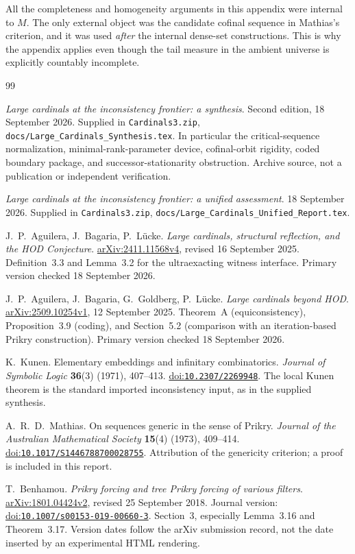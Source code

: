 \documentclass[11pt,letterpaper]{article}
\theoremstyle{definition}
\numberwithin{equation}{section}
\newcommand{\arxiv}[1]{\href{https://arxiv.org/abs/#1}{arXiv:#1}}
\newcommand{\doi}[1]{\href{https://doi.org/#1}{doi:\nolinkurl{#1}}}
\begin{document}
All the completeness and homogeneity arguments in this appendix were
internal to $M$. The only external object was the candidate cofinal
sequence in Mathias's criterion, and it was used \emph{after} the
internal dense-set constructions. This is why the appendix applies
even though the tail measure in the ambient universe is explicitly
countably incomplete.

\clearpage
{}
{}
\begin{thebibliography}{99}
\small
\setlength{\itemsep}{6pt}

\emph{Large cardinals at the inconsistency frontier: a synthesis}.
Second edition, 18 September 2026. Supplied in \nolinkurl{Cardinals3.zip},
\nolinkurl{docs/Large_Cardinals_Synthesis.tex}. In particular the
critical-sequence normalization, minimal-rank-parameter device,
cofinal-orbit rigidity, coded boundary package, and successor-stationarity
obstruction. Archive source, not a publication or independent verification.

\emph{Large cardinals at the inconsistency frontier: a unified assessment}.
18 September 2026. Supplied in \nolinkurl{Cardinals3.zip},
\nolinkurl{docs/Large_Cardinals_Unified_Report.tex}.

J.~P.~Aguilera, J.~Bagaria, P.~L\"ucke.
\emph{Large cardinals, structural reflection, and the HOD Conjecture}.
\arxiv{2411.11568v4}, revised 16 September 2025.
Definition~3.3 and Lemma~3.2 for the ultraexacting witness interface.
Primary version checked 18 September 2026.

J.~P.~Aguilera, J.~Bagaria, G.~Goldberg, P.~L\"ucke.
\emph{Large cardinals beyond HOD}.
\arxiv{2509.10254v1}, 12 September 2025.
Theorem~A (equiconsistency), Proposition~3.9 (coding), and
Section~5.2 (comparison with an iteration-based Prikry construction).
Primary version checked 18 September 2026.

K.~Kunen.
Elementary embeddings and infinitary combinatorics.
\emph{Journal of Symbolic Logic} \textbf{36}(3) (1971), 407--413.
\doi{10.2307/2269948}.
The local Kunen theorem is the standard imported inconsistency input,
as in the supplied synthesis.

A.~R.~D.~Mathias.
On sequences generic in the sense of Prikry.
\emph{Journal of the Australian Mathematical Society}
\textbf{15}(4) (1973), 409--414.
\doi{10.1017/S1446788700028755}.
Attribution of the genericity criterion; a proof is included in this report.

T.~Benhamou.
\emph{Prikry forcing and tree Prikry forcing of various filters}.
\arxiv{1801.04424v2}, revised 25 September 2018.
Journal version: \doi{10.1007/s00153-019-00660-3}.
Section~3, especially Lemma~3.16 and Theorem~3.17.
Version dates follow the arXiv submission record, not the date inserted
by an experimental HTML rendering.

\end{thebibliography}
\end{document}
